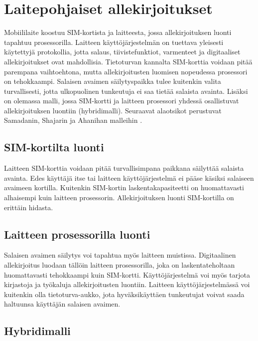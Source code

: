 \documentclass[finnish]{tktltiki2}
\theoremstyle{definition}
\theoremstyle{remark}
\begin{document}
\section{Laitepohjaiset allekirjoitukset}

Mobiililaite koostuu SIM-kortista ja laitteesta, jossa allekirjoituksen luonti tapahtuu prosessorilla. Laitteen käyttöjärjestelmän on tuettava yleisesti käytettyjä protokollia, jotta salaus, tiivistefunktiot, varmenteet ja digitaaliset allekirjoitukset ovat mahdollisia. Tietoturvan kannalta SIM-korttia voidaan pitää parempana vaihtoehtona, mutta allekirjoitusten luomisen nopeudessa prosessori on tehokkaampi. Salaisen avaimen säilytyspaikka tulee kuitenkin valita turvallisesti, jotta ulkopuolinen tunkeutuja ei saa tietää salaista avainta. Lisäksi on olemassa malli, jossa SIM-kortti ja laitteen prosessori yhdessä osallistuvat allekirjoituksen luontiin (hybridimalli). Seuraavat alaotsikot perustuvat Samadanin, Shajarin ja Ahanihan malleihin \cite{proxy}. 
 
\subsection{SIM-kortilta luonti}

Laitteen SIM-korttia voidaan pitää turvallisimpana paikkana säilyttää salaista avainta. Edes käyttäjä itse tai laitteen käyttöjärjestelmä ei pääse käsiksi salaiseen avaimeen kortilla. Kuitenkin SIM-kortin laskentakapasiteetti on huomattavasti alhaisempi kuin laitteen prosessorin. Allekirjoituksen luonti SIM-kortilla on erittäin hidasta.   

\subsection{Laitteen prosessorilla luonti}

Salaisen avaimen säilytys voi tapahtua myös laitteen muistissa. Digitaalinen allekirjoitus luodaan tällöin laitteen prosessorilla, joka on laskentateholtaan huomattavasti tehokkaampi kuin SIM-kortti. Käyttöjärjestelmä voi myös tarjota kirjastoja ja työkaluja allekirjoitusten luontiin. Laitteen käyttöjärjestelmässä voi kuitenkin olla tietoturva-aukko, jota hyväksikäyttäen tunkeutujat voivat saada haltuunsa käyttäjän salaisen avaimen.

\subsection{Hybridimalli}
\end{document}
